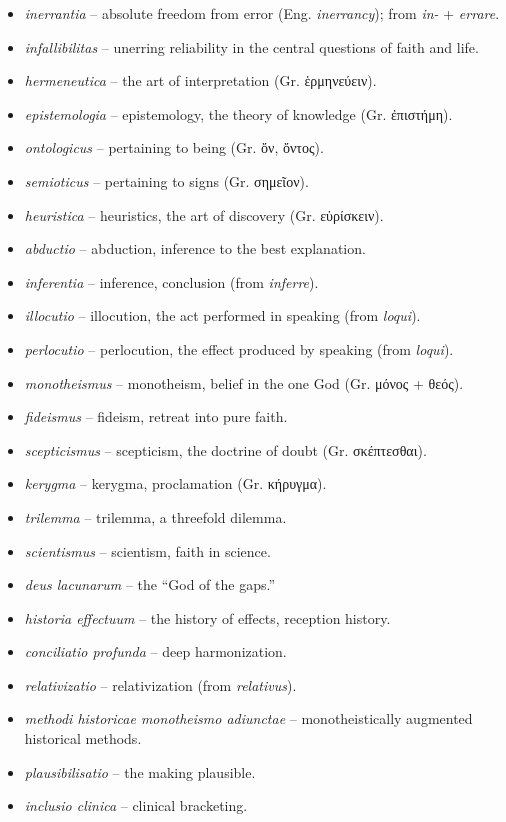 \documentclass[11pt,a4paper]{article}
\begin{document}
\begin{itemize}[leftmargin=0em, label={}, itemsep=2pt, parsep=0pt]
  \item \textit{inerrantia} -- absolute freedom from error (Eng. \textit{inerrancy}); from \textit{in-} + \textit{errare}.
  \item \textit{infallibilitas} -- unerring reliability in the central questions of faith and life.
  \item \textit{hermeneutica} -- the art of interpretation (Gr. ἑρμηνεύειν).
  \item \textit{epistemologia} -- epistemology, the theory of knowledge (Gr. ἐπιστήμη).
  \item \textit{ontologicus} -- pertaining to being (Gr. ὄν, ὄντος).
  \item \textit{semioticus} -- pertaining to signs (Gr. σημεῖον).
  \item \textit{heuristica} -- heuristics, the art of discovery (Gr. εὑρίσκειν).
  \item \textit{abductio} -- abduction, inference to the best explanation.
  \item \textit{inferentia} -- inference, conclusion (from \textit{inferre}).
  \item \textit{illocutio} -- illocution, the act performed in speaking (from \textit{loqui}).
  \item \textit{perlocutio} -- perlocution, the effect produced by speaking (from \textit{loqui}).
  \item \textit{monotheismus} -- monotheism, belief in the one God (Gr. μόνος + θεός).
  \item \textit{fideismus} -- fideism, retreat into pure faith.
  \item \textit{scepticismus} -- scepticism, the doctrine of doubt (Gr. σκέπτεσθαι).
  \item \textit{kerygma} -- kerygma, proclamation (Gr. κήρυγμα).
  \item \textit{trilemma} -- trilemma, a threefold dilemma.
  \item \textit{scientismus} -- scientism, faith in science.
  \item \textit{deus lacunarum} -- the ``God of the gaps.''
  \item \textit{historia effectuum} -- the history of effects, reception history.
  \item \textit{conciliatio profunda} -- deep harmonization.
  \item \textit{relativizatio} -- relativization (from \textit{relativus}).
  \item \textit{methodi historicae monotheismo adiunctae} -- monotheistically augmented historical methods.
  \item \textit{plausibilisatio} -- the making plausible.
  \item \textit{inclusio clinica} -- clinical bracketing.
\end{itemize}

\newpage


\end{document}
